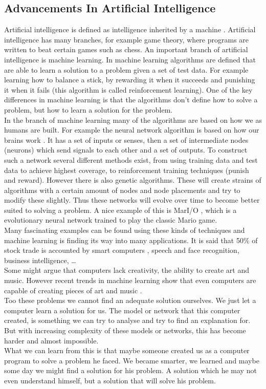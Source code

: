 \documentclass[a4paper]{article}
\begin{document}
\subsection{Advancements In Artificial Intelligence}
Artificial intelligence is defined as intelligence inherited by a machine \cite{AIbasic}. Artificial intelligence has many branches, for example game theory, where programs are written to beat certain games such as chess. An important branch of artificial intelligence is machine learning. In machine learning algorithms are defined that are able to learn a solution to a problem given a set of test data. For example learning how to balance a stick, by rewarding it when it succeeds and punishing it when it fails (this algorithm is called reinforcement learning). One of the key differences in machine learning is that the algorithms don't define how to solve a problem, but how to learn a solution for the problem.\\

In the branch of machine learning many of the algorithms are based on how we as humans are built. For example the neural network algorithm is based on how our brains work \cite{Nnetwork}. It has a set of inputs or senses, then a set of intermediate nodes (neurons) which send signals to each other and a set of outputs. To construct such a network several different methods exist, from using training data and test data to achieve highest coverage, to reinforcement training techniques (punish and reward). However there is also genetic algorithms. These will create strains of algorithms with a certain amount of nodes and node placements and try to modify these slightly. Thus these networks will evolve over time to become better suited to solving a problem. A nice example of this is MarI/O \cite{Mario}, which is a evolutionary neural network trained to play the classic Mario game.\\

Many fascinating examples can be found using these kinds of techniques and machine learning is finding its way into many applications. It is said that 50\% of stock trade is accounted by smart computers \cite{Stocks}, speech and face recognition, business intelligence, \dots\\
Some might argue that computers lack creativity, the ability to create art and music. However recent trends in machine learning show that even computers are capable of creating pieces of art and music \cite{music}.\\
Too these problems we cannot find an adequate solution ourselves. We just let a computer learn a solution for us. The model or network that this computer created, is something we can try to analyse and try to find an explanation for. But with increasing complexity of these models or networks, this has become harder and almost impossible.\\
What we can learn from this is that maybe someone created us as a computer program to solve a problem he faced. We became smarter, we learned and maybe some day we might find a solution for his problem. A solution which he may not even understand himself, but a solution that will solve his problem.
 
\end{document}
